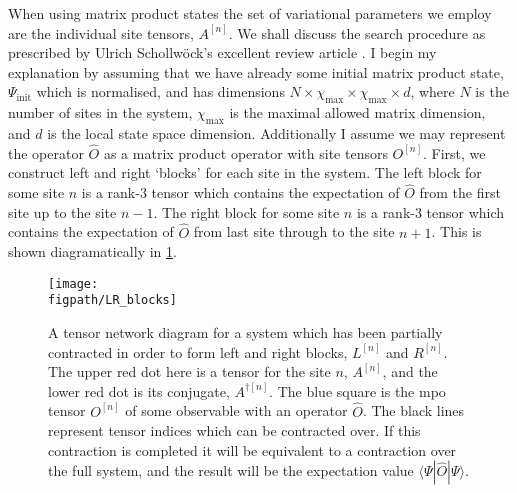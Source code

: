 When using matrix product states the set of variational parameters we employ are the individual site tensors, \(A^{[n]}\). We shall discuss the search procedure as prescribed by Ulrich Schollw\"{o}ck's excellent review article \cite{Schollwoeck11}. I begin my explanation by assuming that we have already some initial matrix product state, \(\Psi_{\mathrm{init}}\) which is normalised, and has dimensions \(N \times \chi_{\mathrm{max}} \times \chi_{\mathrm{max}} \times d\), where \(N\) is the number of sites in the system, \(\chi_{\mathrm{max}}\) is the maximal allowed matrix dimension, and \(d\) is the local state space dimension. Additionally I assume we may represent the operator \(\hat{O}\) as a matrix product operator with site tensors \(O^{[n]}\). First, we construct left and right `blocks' for each site in the system. The left block for some site \(n\) is a rank-3 tensor which contains the expectation of \(\hat{O}\) from the first site up to the site \(n-1\). The right block for some site \(n\) is a rank-3 tensor which contains the expectation of \(\hat{O}\) from last site through to the site \(n+1\). This is shown diagramatically in \cref{fig:vs1-2}.

\begin{figure}[ht!]
\centering
\texttt{[image: \\figpath/LR\_blocks]}
\caption{A tensor network diagram for a system which has been partially contracted in order to form left and right blocks, \(L^{[n]}\) and \(R^{[n]}\). The upper red dot here is a tensor for the site \(n\), \(A^{[n]}\), and the lower red dot is its conjugate, \(A^{\dagger [n]}\). The blue square is the mpo tensor \(O^{[n]}\) of some observable with an operator \(\hat{O}\). The black lines represent tensor indices which can be contracted over. If this contraction is completed it will be equivalent to a contraction over the full system, and the result will be the expectation value \(\langle \Psi | \hat{O} | \Psi \rangle \).}
\label{fig:vs1-2}
\end{figure}

